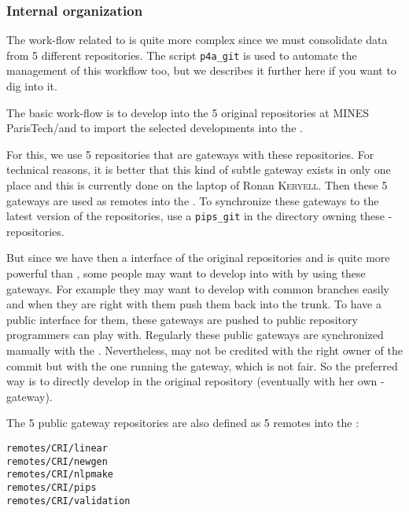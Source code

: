 \documentclass[a4paper]{article}
\begin{document}
\subsubsection{Internal organization}
\label{sec:intern-organ}


The work-flow related to \Apips is quite more complex since we must
consolidate data from 5 different \Asvn repositories. The script
\verb|p4a_git| is used to automate the management of this workflow too,
but we describes it further here if you want to dig into it.

The basic \Apips work-flow is to develop into the 5 original \Apips{}
\Asvn repositories at MINES ParisTech/\Acri and to import the selected
developments into the \Apfa{} \Agit.

For this, we use 5 \Agit repositories that are gateways with these \Asvn
repositories. For technical reasons, it is better that this kind of subtle
gateway exists in only one place and this is currently done on the laptop
of Ronan \textsc{Keryell}. Then these 5 gateways are used as remotes into
the \Apfa{} \Agit. To synchronize these gateways to the latest version of
the \Apips{} \Asvn repositories, use a \verb|pips_git| in the directory
owning these \Agit-\Asvn repositories.

But since we have then a \Agit interface of the original \Apips{} \Asvn
repositories and \Agit is quite more powerful than \Asvn, some people may
want to develop into \Apips with \Agit by using these gateways. For
example they may want to develop with common branches easily and when they
are right with them push them back into the \Apips{} \Asvn trunk. To have
a public interface for them, these \Agit gateways are pushed to public
\Agit repository programmers can play with. Regularly these public
gateways are synchronized manually with the \Apips{} \Asvn. Nevertheless,
\Asvn may not be credited with the right owner of the commit but with the
one running the gateway, which is not fair. So the preferred way is to
directly develop in the original \Apips \Asvn repository (eventually with
her own \Agit-\Asvn gateway).

The 5 public gateway \Agit repositories are also defined as 5 remotes into
the \Apfa{} \Agit:
\begin{description}
\item[\texttt{remotes/CRI/linear}]
\item[\texttt{remotes/CRI/newgen}]
\item[\texttt{remotes/CRI/nlpmake}]
\item[\texttt{remotes/CRI/pips}]
\item[\texttt{remotes/CRI/validation}]
\end{description}
\end{document}

